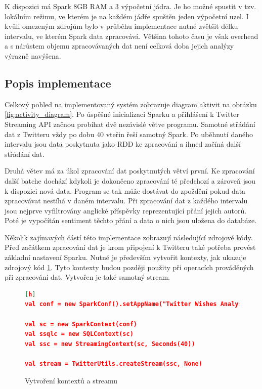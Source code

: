 \documentclass[thesis=B,czech]{FITthesis}[2012/06/26]
\begin{document}
K dispozici má Spark 8GB RAM a 3 výpočetní jádra. Je ho možné spustit v tzv. lokálním režimu, ve kterém je na každém jádře spuštěn jeden výpočetní uzel. I kvůli omezeným zdrojům bylo v průběhu implementace nutné zvětšit délku intervalu, ve kterém Spark data zpracovává. Většina tohoto času je však overhead a s nárůstem objemu zpracovávaných dat není celková doba jejich analýzy výrazně navýšena. 

\subsection{Popis implementace}

Celkový pohled na implementovaný systém zobrazuje diagram aktivit na obrázku \ref{fig:activity_diagram}. Po úspěšné inicializaci Sparku a přihlášení k Twitter Streaming API začnou probíhat dvě nezávislé větve programu. Samotné střádání dat z Twitteru vždy po dobu 40 vteřin řeší samotný Spark. Po uběhnutí daného intervalu jsou data poskytnuta jako RDD ke zpracování a ihned začíná další střádání dat. 

Druhá větev má za úkol zpracování dat poskytnutých větví první. Ke zpracování další batche dochází kdykoli je dokončeno zpracování té předchozí a zároveň jsou k dispozici nová data. Program se tak může dostávat do zpoždění pokud data zpracovávat nestíhá v daném intervalu. Při zpracování dat z každého intervalu jsou nejprve vyfiltrovány anglické příspěvky reprezentující přání jejich autorů. Poté je vypočítán sentiment těchto přání a data o nich jsou uložena do databáze. 

Několik zajímavých částí této implementace zobrazují následující zdrojové kódy. Před začátkem zpracování dat je krom připojení k Twitteru také potřeba provést základní nastavení Sparku. Nutné je především vytvořit kontexty, jak ukazuje zdrojový kód \ref{fig:spark-context}. Tyto kontexty budou později použity při operacích prováděných při zpracování dat. Vytvořen je také samotný stream. 

\begin{figure}
\begin{lstlisting}[language=json,firstnumber=1][h]
val conf = new SparkConf().setAppName("Twitter Wishes Analysis")

val sc = new SparkContext(conf)
val ssqlc = new SQLContext(sc)
val ssc = new StreamingContext(sc, Seconds(40))

val stream = TwitterUtils.createStream(ssc, None)
\end{lstlisting}
\caption{Vytvoření kontextů a streamu}
\label{fig:spark-context}
\end{figure} 
\end{document}
